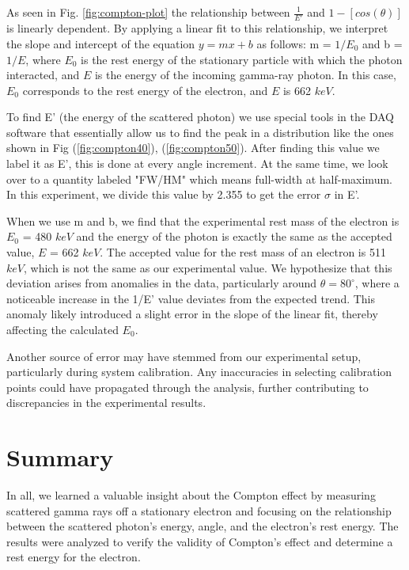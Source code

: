 \documentclass[a4paper,12pt,english]{all-in-one} %
\begin{document}
\begin{multicols}{2}
{As seen in Fig. \ref{fig:compton-plot} the relationship between $\frac{1}{E'}$ and $1-[cos(\theta)]$ is linearly dependent. By applying a linear fit to this relationship, we interpret the slope and intercept of the equation $y=mx+b$ as follows: m = $1/E_0$ and b = $1/E$, where $E_0$ is the rest energy of the stationary particle with which the photon interacted, and $E$ is the energy of the incoming gamma-ray photon. In this case, $E_0$ corresponds to the rest energy of the electron, and $E$ is 662 $keV$.

To find E' (the energy of the scattered photon) we use special tools in the DAQ software that essentially allow us to find the peak in a distribution like the ones shown in Fig (\ref{fig:compton40}), (\ref{fig:compton50}). After finding this value we label it as E', this is done at every angle increment. At the same time, we look over to a quantity labeled "FW/HM" which means full-width at half-maximum. In this experiment, we divide this value by 2.355 to get the error $\sigma$ in E'.

When we use m and b, we find that the experimental rest mass of the electron is $E_0$ = 480 $keV$ and the energy of the photon is exactly the same as the accepted value, $E$ = 662 $keV$. The accepted value for the rest mass of an electron is 511 $keV$, which is not the same as our experimental value. We hypothesize that this deviation arises from anomalies in the data, particularly around $\theta = 80^{\circ}$, where a noticeable increase in the 1/E' value deviates from the expected trend. This anomaly likely introduced a slight error in the slope of the linear fit, thereby affecting the calculated $E_0$.

Another source of error may have stemmed from our experimental setup, particularly during system calibration. Any inaccuracies in selecting calibration points could have propagated through the analysis, further contributing to discrepancies in the experimental results.

}
\end{multicols}


\section*{Summary}
{
 In all, we learned a valuable insight about the Compton effect by measuring scattered gamma rays off a stationary electron and focusing on the relationship between the scattered photon’s energy, angle, and the electron’s rest energy. The results were analyzed to verify the validity of Compton's effect and determine a rest energy for the electron.
}
\end{document}
